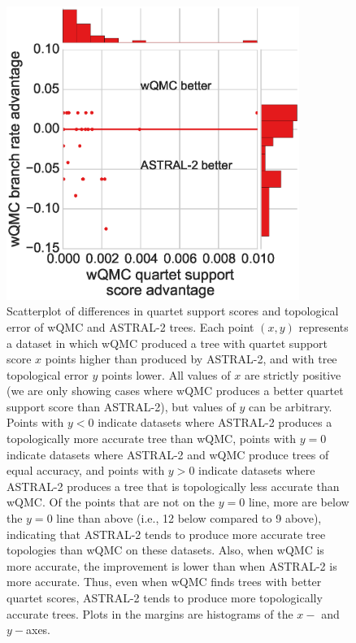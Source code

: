   \begin{figure}[h!]
 \includegraphics[width=0.85\textwidth]{hgt-figs/quartet-score-comparison.eps}
 \caption[Differences in quartet support scores
and topological error of wQMC and ASTRAL-2  trees]{{Scatterplot of differences in quartet support scores
and topological error of wQMC and ASTRAL-2  trees. } 
Each point $(x,y)$ represents a dataset in which
wQMC produced a tree with quartet support score 
$x$ points higher than produced by ASTRAL-2, and
with tree topological error $y$ points lower. 
All values of $x$ are strictly positive 
(we are only showing cases where wQMC %
produces a better quartet support score %
than ASTRAL-2), but values of $y$ can be arbitrary.
Points with $y < 0$ indicate datasets where ASTRAL-2 produces
a topologically more accurate tree than wQMC, points with $y=0$
indicate datasets where ASTRAL-2 and wQMC produce trees of equal accuracy,
and points with $y>0$ indicate datasets where ASTRAL-2 produces
a tree that is topologically less accurate than wQMC. 
Of the points that are not on the $y=0$ line, more are below
the $y=0$ line than above (i.e., 12 below compared to 9 above), 
indicating that ASTRAL-2 tends to
produce  more accurate tree topologies than wQMC on these datasets.
Also, when wQMC is more accurate, the
improvement is lower than when ASTRAL-2 is more accurate.
Thus, even when wQMC finds trees with better quartet scores, ASTRAL-2
tends to produce more topologically accurate trees.
Plots in the margins are histograms of the $x-$ and $y-$axes.
} 
\label{hgt::fig4}
       \end{figure}



